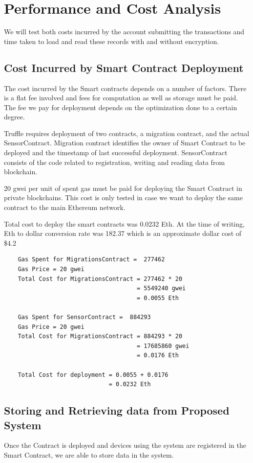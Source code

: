 \documentclass[11pt,openright]{report}
\begin{document}
\chapter{Performance and Cost Analysis}
\label{chapter:experiment_results}
We will test both costs incurred by the account submitting the transactions and time taken to load and read these records with and without encryption.

\section{Cost Incurred by Smart Contract Deployment}
The cost incurred by the Smart contracts depends on a number of factors. There is a flat fee involved and fees for computation as well as storage must be paid. The fee we pay for deployment depends on the optimization done to a certain degree. 

Truffle requires deployment of two contracts, a migration contract, and the actual SensorContract. Migration contract identifies the owner of Smart Contract to be deployed and the timestamp of last successful deployment. SensorContract consists of the code related to registration, writing and reading data from blockchain. 

20 gwei per unit of spent gas must be paid for deploying the Smart Contract in private blockchains. This cost is only tested in case we want to deploy the same contract to the main Ethereum network. 

Total cost to deploy the smart contracts was 0.0232 Eth. At the time of writing, Eth to dollar conversion rate was 182.37 which is an approximate dollar cost of \$4.2

\begin{verbatim}
    Gas Spent for MigrationsContract =  277462
    Gas Price = 20 gwei
    Total Cost for MigrationsContract = 277462 * 20
                                      = 5549240 gwei
                                      = 0.0055 Eth
    
    Gas Spent for SensorContract =  884293
    Gas Price = 20 gwei
    Total Cost for MigrationsContract = 884293 * 20
                                      = 17685860 gwei
                                      = 0.0176 Eth                           
    
    Total Cost for deployment = 0.0055 + 0.0176
                              = 0.0232 Eth
\end{verbatim}


\section{Storing and Retrieving data from Proposed System}
Once the Contract is deployed and devices using the system are registered in the Smart Contract, we are able to store data in the system.
\end{document}
